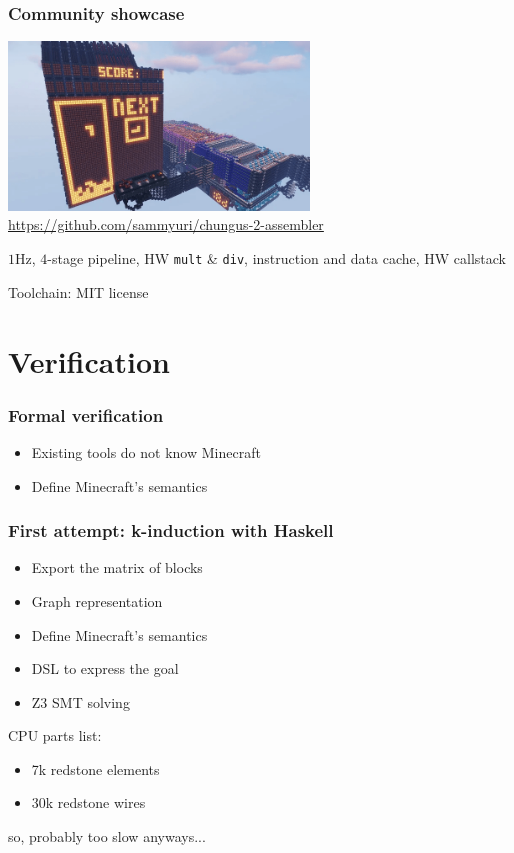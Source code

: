 \documentclass[aspectratio=169]{beamer}
\newcommand{\hw}{HW}
\begin{document}
\begin{frame}
	\frametitle{Community showcase}
	\center
	\includegraphics[width=0.6\textwidth]{imgs/chungus.png}
	\url{https://github.com/sammyuri/chungus-2-assembler}

	$1$Hz, $4$-stage pipeline, \hw{} \texttt{mult} \& \texttt{div}, instruction
	and data cache, \hw{} callstack

	Toolchain: MIT license
\end{frame}

\section{Verification}

\begin{frame}
	\frametitle{Formal verification}
	\begin{itemize}
		\item Existing tools do not know Minecraft
		\item Define Minecraft's semantics
	\end{itemize}
\end{frame}

\begin{frame}
	\frametitle{First attempt: k-induction with Haskell}
	\begin{itemize}
		\item Export the matrix of blocks
		\item Graph representation %
		\item Define Minecraft's semantics
		\item DSL to express the goal
		\item Z3 SMT solving
	\end{itemize}


	CPU parts list:
	\begin{itemize}
		\item 7k redstone elements
		\item 30k redstone wires
	\end{itemize}

	so, probably too slow anyways...
\end{frame}
\end{document}
